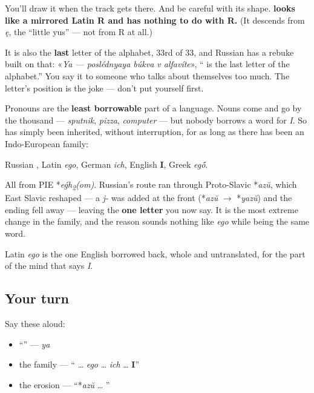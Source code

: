 You'll draw it when the track gets there. And be careful with its shape. \textbf{ looks like a mirrored Latin R and has nothing to do with R.} (It descends from \emph{ę}, the \textquotedblleft{}little yus\textquotedblright{} — not from R at all.)

It is also the \textbf{last} letter of the alphabet, 33rd of 33, and Russian has a rebuke built on that: «\emph{Ya — poslédnyaya búkva v alfavíte}», \textquotedblleft{}\emph{} is the last letter of the alphabet.\textquotedblright{} You say it to someone who talks about themselves too much. The letter's position is the joke — don't put yourself first.

\begin{cousinweb}
Pronouns are the \textbf{least borrowable} part of a language. Nouns come and go by the thousand — \emph{sputnik}, \emph{pizza}, \emph{computer} — but nobody borrows a word for \emph{I}. So \emph{} has simply been inherited, without interruption, for as long as there has been an Indo-European family:

Russian \textbf{}, Latin \emph{ego}, German \emph{ich}, English \textbf{I}, Greek \emph{eg\'{\={o}}}.

All from PIE *\emph{eǵh\textsubscript{2}(om)}. Russian's route ran through Proto-Slavic *\emph{azŭ}, which East Slavic reshaped — a \emph{j-} was added at the front (*\emph{azŭ} $\to$ *\emph{yazŭ}) and the ending fell away — leaving the \textbf{one letter} you now say. It is the most extreme change in the family, and the reason \emph{} sounds nothing like \emph{ego} while being the same word.

Latin \emph{ego} is the one English borrowed back, whole and untranslated, for the part of the mind that says \emph{I}.
\end{cousinweb}

\subsection*{Your turn}
Say these aloud:

\begin{itemize}
\raggedright
  \item \textquotedblleft{}\textquotedblright{} — \emph{ya}
  \item the family — \textquotedblleft{}\textbf{} … \emph{ego} … \emph{ich} … \textbf{I}\textquotedblright{}
  \item the erosion — \textquotedblleft{}*\emph{azŭ} … \textbf{}\textquotedblright{}
\end{itemize}

